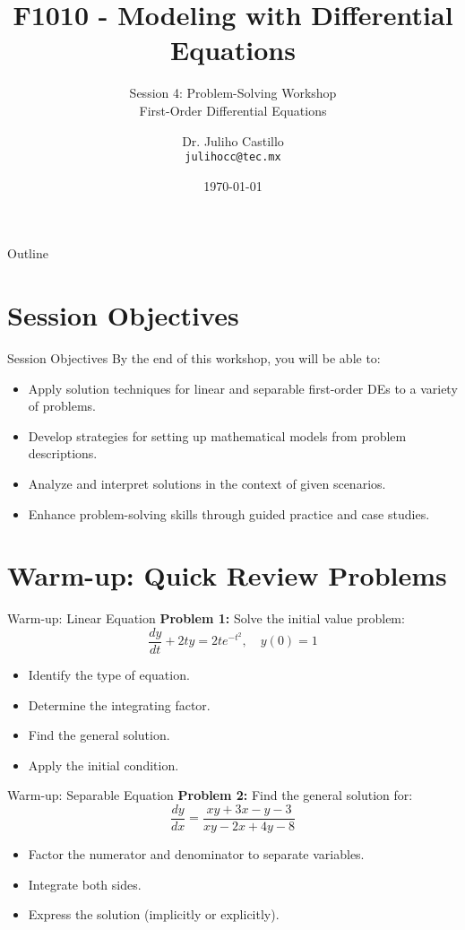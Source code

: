 \documentclass[10pt,aspectratio=169]{beamer}
\title{F1010 - Modeling with Differential Equations}
\subtitle{Session 4: Problem-Solving Workshop \\ First-Order Differential Equations}
\author{Dr. Juliho Castillo\\\texttt{julihocc@tec.mx}}
\institute{Tec de Monterrey}
\date{\today}
\newcommand{\concept}[1]{\textbf{#1}}
\newcommand{\formula}[1]{\textit{#1}}
\begin{document}
\maketitle

\begin{frame}{Outline}
    \tableofcontents
\end{frame}

\section{Session Objectives}
\begin{frame}{Session Objectives}
    By the end of this workshop, you will be able to:
    \begin{itemize}
        \item Apply solution techniques for linear and separable first-order DEs to a variety of problems.
        \item Develop strategies for setting up mathematical models from problem descriptions.
        \item Analyze and interpret solutions in the context of given scenarios.
        \item Enhance problem-solving skills through guided practice and case studies.
    \end{itemize}
\end{frame}

\section{Warm-up: Quick Review Problems}
\begin{frame}{Warm-up: Linear Equation}
    \concept{Problem 1:} Solve the initial value problem:
    \formula{\[ \frac{dy}{dt} + 2ty = 2te^{-t^2}, \quad y(0) = 1 \]}
    \begin{itemize}
        \item Identify the type of equation.
        \item Determine the integrating factor.
        \item Find the general solution.
        \item Apply the initial condition.
    \end{itemize}
\end{frame}

\begin{frame}{Warm-up: Separable Equation}
    \concept{Problem 2:} Find the general solution for:
    \formula{\[ \frac{dy}{dx} = \frac{xy+3x-y-3}{xy-2x+4y-8} \]}
    \begin{itemize}
        \item Factor the numerator and denominator to separate variables.
        \item Integrate both sides.
        \item Express the solution (implicitly or explicitly).
    \end{itemize}
\end{frame}
\end{document}

